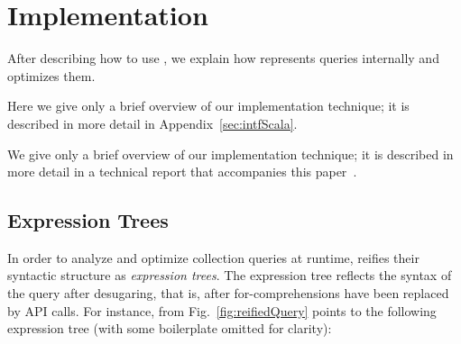 


\section{Implementation}
\label{sec:implementation}

After describing how to use {\LoS}, we explain how \LoS{} represents queries internally and optimizes them.
\begin{techrep}
Here we give only a brief overview of our implementation technique; it is described in more detail
in Appendix~\ref{sec:intfScala}.
\end{techrep}
\begin{nontechrep}
We give only a brief overview of our implementation technique; it is described in more detail
in a technical report that accompanies this paper~\citep{GiarrussoEtAl2012ReifyTR}.
\end{nontechrep}

\subsection{Expression Trees}
\label{sec:representation}
In order to analyze and optimize collection queries at runtime, {\LoS} reifies their syntactic structure as \emph{expression trees}.
The expression tree reflects the syntax of the query after desugaring, that is, after for-comprehensions have been replaced by API calls.
For instance,  from Fig.~\ref{fig:reifiedQuery} points to the
following expression tree (with some boilerplate omitted for clarity):

